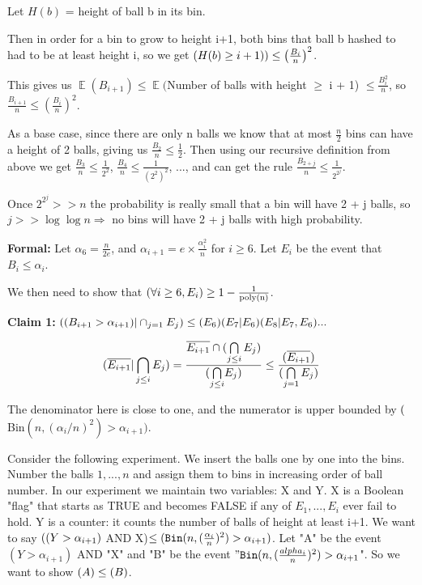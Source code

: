 \documentclass[11pt]{article}
\DeclareMathOperator*{\E}{\mathbb{E}}
\let\Pr\relax
\DeclareMathOperator*{\Pr}{\mathbb{P}}
\newcommand{\bin}{\texttt{Bin}}
\begin{document}
Let $H(b)$ = height of ball b in its bin.

Then in order for a bin to grow to height i+1, both bins that ball b hashed to had to be at least height i, so we get $\Pr(H(b) \geq i+1)) \leq \left(\frac{B_i}{n}\right)^2$.

This gives us $\E(B_{i+1}) \leq \E($Number of balls with height $\geq$ i + 1) $\leq \frac{B_i^2}{n}$, so $\frac{B_{i+1}}{n} \leq (\frac{B_i}{n})^2$.

As a base case, since there are only n balls we know that at most $\frac{n}{2}$ bins can have a height of 2 balls, giving us $\frac{B_2}{n} \leq \frac{1}{2}$.  Then using our recursive definition from above we get $\frac{B_3}{n} \leq \frac{1}{2^2}$, $\frac{B_4}{n} \leq \frac{1}{(2^2)^2}$, ..., and can get the rule $\frac{B_{2+j}}{n} \leq \frac{1}{2^{2^j}}$.

Once $2^{2^j} >> n$ the probability is really small that a bin will have 2 + j balls, so $j >> \log\log n \Rightarrow$ no bins will have 2 + j balls with high probability.

\textbf{Formal:} Let $\alpha_6 = \frac{n}{2e}$, and $\alpha_{i+1} = e \times \frac{\alpha_i^2}{n}$ for $i \geq 6$.  Let $E_i$ be the event that $B_i \leq \alpha_i$.

We then need to show that $\Pr{(\forall i \geq 6, E_i)} \geq 1 - \frac{1}{\textnormal{poly(n)}}$.

\textbf{Claim 1:}  $\Pr{((B_{i+1} > \alpha_{i+1}) | \cap_{j=1} E_j)} \leq \Pr(E_6)\Pr(E_7|E_6)\Pr(E_8|E_7,E_6)...$

\[\Pr(\overline{E_{i+1}} | \bigcap\limits_{j \leq i} E_j) = \frac{\Pr{\overline{E_{i+1}} \cap (\bigcap\limits_{j \leq i} E_j)}}{\Pr({\bigcap\limits_{j \leq i}} E_j)} \leq \frac{\Pr{(\overline{E_{i + 1}})}}{\Pr{(\bigcap\limits_{j=1} E_j)}}\]

The denominator here is close to one, and the numerator is upper bounded by $\Pr($Bin$(n, (\alpha_i/n)^2) > \alpha_{i+1})$.

Consider the following experiment. We insert the balls one by one into
the bins. Number the balls $1,...,n$ and assign them to bins in
increasing order of ball number. In our experiment we maintain two
variables: X and Y. X is a Boolean "flag" that starts as TRUE and
becomes FALSE if any of $E_1,...,E_i$ ever fail to hold. Y is a counter:
it counts the number of balls of height at least i+1. We want to say
$\Pr((Y>\alpha_{i+1})$ AND X)$ \leq \Pr( \bin(n, (\frac{\alpha_i}{n})^2) > \alpha_{i+1})$.
Let "A" be the event $(Y>\alpha_{i+1})$ AND "X" and "B" be the event
$"\bin(n, (\frac{alpha_i}{n})^2) > \alpha_{i+1}$". So we want to show $\Pr(A) \leq \Pr(B)$.
\end{document}

